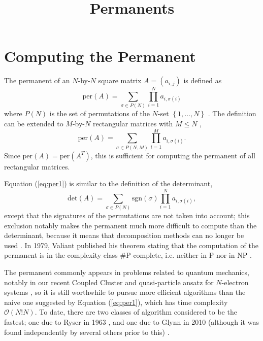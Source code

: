 \documentclass{article}
\title{Permanents}
\begin{document}
\section*{Computing the Permanent}

The permanent of an $N$-by-$N$ square matrix $A = \left(a_{i,j}\right)$ is defined as
\begin{equation} \label{eq:per1}
    \text{per}(A) = \sum_{\sigma \in P(N)}{\prod_{i=1}^N{a_{i,{\sigma(i)}}}}
\end{equation}
where $P(N)$ is the set of permutations of the $N$-set $\left\{1,\dots,N\right\}$
\cite{wiki:permanent}. The definition can be extended to $M$-by-$N$ rectangular matrices with
$M \leq N$ \cite{wiki:permanent}, 
\begin{equation} \label{eq:rectper1}
    \text{per}(A) = \sum_{\sigma \in P(N,M)}{\prod_{i=1}^M{a_{i,{\sigma(i)}}}}.
\end{equation}
Since $\text{per}(A) = \text{per}(A^T)$, this is sufficient for computing the permanent of all
rectangular matrices.

Equation (\ref{eq:per1}) is similar to the definition of the determinant,
\begin{equation} \label{eq:det1}
    \text{det}(A) = \sum_{\sigma \in P(N)}{\text{sgn}(\sigma) \prod_{i=1}^N{a_{i,{\sigma(i)}}}},
\end{equation}
except that the signatures of the permutations are not taken into account; this exclusion notably
makes the permanent much more difficult to compute than the determinant, because it means that
decomposition methods can no longer be used \cite{wiki:computing}. In 1979, Valiant published his
theorem stating that the computation of the permanent is in the complexity class \#P-complete, i.e.
neither in P nor in NP \cite{valiant1979}.

The permanent commonly appears in problems related to quantum mechanics,
notably in our recent Coupled Cluster and quasi-particle ansatz for $N$-electron systems
\cite{limacher2013,johnson2017,kim2021}, so it is still worthwhile to pursue more efficient
algorithms than the naive one suggested by Equation (\ref{eq:per1}), which has time complexity
$\mathcal{O}(N!N)$. To date, there are two classes of algorithm considered to be the fastest; one
due to Ryser in 1963 \cite{ryser1963}, and one due to Glynn in 2010 (although it was found
independently by several others prior to this) \cite{wiki:computing,glynn2010}.
\end{document}
